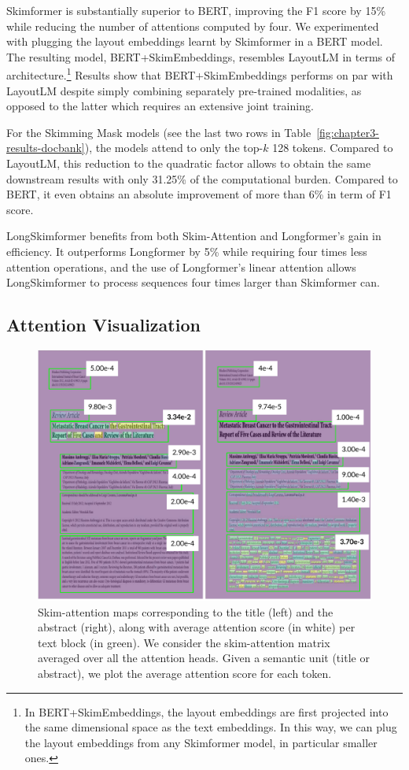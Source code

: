 Skimformer is substantially superior to \ac{BERT}, improving the F1 score by 15\% while reducing the number of attentions computed by four. We experimented with plugging the layout embeddings learnt by Skimformer in a \ac{BERT} model. The resulting model, BERT+SkimEmbeddings, resembles LayoutLM in terms of architecture.\footnote{In BERT+SkimEmbeddings, the layout embeddings are first projected into the same dimensional space as the text embeddings. In this way, we can plug the layout embeddings from any Skimformer model, in particular smaller ones.} Results show that BERT+SkimEmbeddings performs on par with LayoutLM despite simply combining separately pre-trained modalities, as opposed to the latter which requires an extensive joint training.

For the Skimming Mask models (see the last two rows in Table~\ref{fig:chapter3-results-docbank}), the models attend to only the top-$k$ 128 tokens. Compared to LayoutLM, this reduction to the quadratic factor allows to obtain the same downstream results with only 31.25\% of the computational burden.
Compared to \ac{BERT}, it even obtains an absolute improvement of more than 6\% in term of F1 score.

LongSkimformer benefits from both Skim-Attention and Longformer's gain in efficiency. It outperforms Longformer by 5\% while requiring four times less attention operations, and the use of Longformer's linear attention allows LongSkimformer to process sequences four times larger than Skimformer can.

\subsection{Attention Visualization}

\begin{figure}
    \centering \small
    \includegraphics[width=.49\textwidth]{images/chapter3/attention-maps_with-average.pdf}
    \caption{Skim-attention maps corresponding to the title (left) and the abstract (right), along with average attention score (in white) per text block (in green). We consider the skim-attention matrix averaged over all the attention heads. Given a semantic unit (title or abstract), we plot the average attention score for each token.
    }
    \label{fig:chapter3-attention-vis}
\end{figure}

